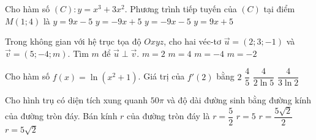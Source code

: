 \begin{ex}%
	Cho hàm số $ (C)\colon y=x^3+3x^2 $. Phương trình tiếp tuyến của $ (C) $ tại điểm $ M(1;4) $ là  
	\choice
	{\True $ y=9x-5 $}
	{$ y=-9x+5 $}
	{$ y=-9x-5 $}
	{$ y=9x+5 $}
\end{ex}



\begin{ex}%
	Trong không gian với hệ trục tọa độ $ Oxyz $, cho hai véc-tơ $ \overrightarrow{u}=(2;3;-1) $ và $ \overrightarrow{v}=(5;-4;m) $. Tìm $ m $ để $ \overrightarrow{u}\perp \overrightarrow{v} $.
	\choice
	{$ m=2 $}
	{$ m=4 $}
	{$ m=-4 $}
	{\True $ m=-2 $}
\end{ex}

\begin{ex}%
	Cho hàm số $ f(x)=\ln(x^2+1) $. Giá trị của $ f'(2) $ bằng
	\choice
	{$ 2 $}
	{\True $ \dfrac{4}{5} $}
	{$ \dfrac{4}{2\ln5} $}
	{$ \dfrac{4}{3\ln2} $}
\end{ex}

\begin{ex}%
	Cho hình trụ có diện tích xung quanh $ 50\pi $ và độ dài đường sinh bằng đường kính của đường tròn đáy. Bán kính $ r $ của đường tròn đáy là
	\choice
	{$ r=\dfrac{5}{2} $}
	{$ r=5 $}
	{\True $ r=\dfrac{5\sqrt{2}}{2} $}
	{$ r=5\sqrt{2} $}
\end{ex}


